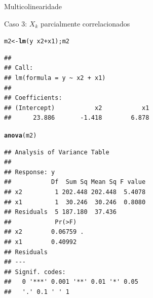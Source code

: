 \documentclass{beamer}\usepackage[]{graphicx}\usepackage[]{color}
\makeatletter
\newcommand{\hlopt}[1]{\textcolor[rgb]{0,0,0}{#1}}%
\newcommand{\hlstd}[1]{\textcolor[rgb]{0.345,0.345,0.345}{#1}}%
\newcommand{\hlkwb}[1]{\textcolor[rgb]{0.69,0.353,0.396}{#1}}%
\newcommand{\hlkwd}[1]{\textcolor[rgb]{0.737,0.353,0.396}{\textbf{#1}}}%
\newenvironment{kframe}{%
 \def\at@end@of@kframe{}%
 \ifinner\ifhmode%
  \def\at@end@of@kframe{\end{minipage}}%
  \begin{minipage}{\columnwidth}%
 \fi\fi%
 \def\FrameCommand##1{\hskip\@totalleftmargin \hskip-\fboxsep
 \colorbox{shadecolor}{##1}\hskip-\fboxsep
     \hskip-\linewidth \hskip-\@totalleftmargin \hskip\columnwidth}%
 \MakeFramed {\advance\hsize-\width
   \@totalleftmargin\z@ \linewidth\hsize
   \@setminipage}}%
 {\par\unskip\endMakeFramed%
 \at@end@of@kframe}
\newenvironment{knitrout}{}{} %
\renewenvironment{knitrout}{\setlength{\topsep}{0mm}}{}
\makeatother
\begin{document}
\begin{frame}[fragile]{Multicolinearidade}

Caso 3: $X_k$ parcialmente correlacionados
\vfill

\begin{knitrout}\tiny
{}\color{fgcolor}\begin{kframe}
\begin{alltt}
\hlstd{m2} \hlkwb{<-} \hlkwd{lm}\hlstd{(y} \hlopt{~} \hlstd{x2} \hlopt{+} \hlstd{x1); m2}
\end{alltt}
\begin{verbatim}
## 
## Call:
## lm(formula = y ~ x2 + x1)
## 
## Coefficients:
## (Intercept)           x2           x1  
##      23.886       -1.418        6.878
\end{verbatim}
\begin{alltt}
\hlkwd{anova}\hlstd{(m2)}
\end{alltt}
\begin{verbatim}
## Analysis of Variance Table
## 
## Response: y
##           Df  Sum Sq Mean Sq F value
## x2         1 202.448 202.448  5.4078
## x1         1  30.246  30.246  0.8080
## Residuals  5 187.180  37.436        
##            Pr(>F)  
## x2        0.06759 .
## x1        0.40992  
## Residuals          
## ---
## Signif. codes:  
##   0 '***' 0.001 '**' 0.01 '*' 0.05
##   '.' 0.1 ' ' 1
\end{verbatim}
\end{kframe}
\end{knitrout}

\end{frame}
\end{document}

